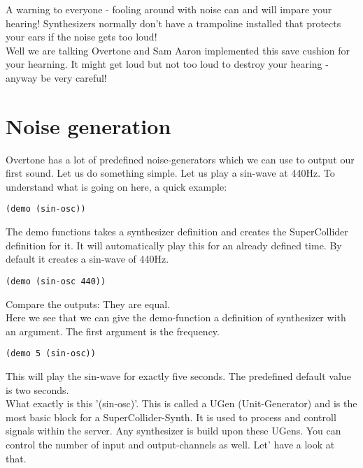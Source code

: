 A warning to everyone - fooling around with noise can and will impare your hearing! Synthesizers normally don't have a trampoline installed that protects your ears if the noise gets too loud!\\
Well we are talking Overtone and Sam Aaron implemented this save cushion for your hearning. It might get loud but not too loud to destroy your hearing - anyway be very careful! 

\section{Noise generation}
Overtone has a lot of predefined noise-generators which we can use to output our first sound. Let us do something simple. Let us play a sin-wave at 440Hz. 
To understand what is going on here, a quick example:

\begin{lstlisting}
(demo (sin-osc))
\end{lstlisting}

The demo functions takes a synthesizer definition and creates the SuperCollider definition for it. It will automatically play this for an already defined time. By default it creates a sin-wave of 440Hz.

\begin{lstlisting}
(demo (sin-osc 440))
\end{lstlisting}

Compare the outputs: They are equal.\\
Here we see that we can give the demo-function a definition of synthesizer with an argument. The first argument is the frequency.

\begin{lstlisting}
(demo 5 (sin-osc))
\end{lstlisting}

This will play the sin-wave for exactly five seconds. The predefined default value is two seconds.\\

What exactly is this '(sin-osc)'. This is called a \gls{UGen} (Unit-Generator) and is the most basic block for a SuperCollider-Synth. It is used to process and controll signals within the server. Any synthesizer is build upon these UGens. You can control the number of input and output-channels as well. Let' have a look at that.

